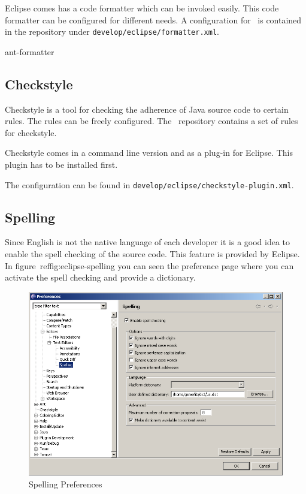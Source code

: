 \documentclass{extex-doc}
\begin{document}
Eclipse comes has a code formatter which can be invoked easily. This
code formatter can be configured for different needs. A configuration
for \ExTeX\ is contained in the repository under
\texttt{develop/eclipse/formatter.xml}.


ant-formatter


\subsection{Checkstyle}

Checkstyle is a tool for checking the adherence of Java source code to
certain rules. The rules can be freely configured. The \ExTeX\
repository contains a set of rules for checkstyle.

Checkstyle comes in a command line version and as a plug-in for
Eclipse. This plugin has to be installed first.

The configuration can be found in \texttt{develop/eclipse/checkstyle-plugin.xml}.


\subsection{Spelling}

Since English is not the native language of each developer it is a
good idea to enable the spell checking of the source code. This
feature is provided by Eclipse. In figure~ref{fig:eclipse-spelling}
you can seen the preference page where you can activate the spell
checking and provide a dictionary.
\begin{figure}[th]
  \centering
  \includegraphics[scale=.4]{image/spelling}
  \caption{Spelling Preferences}\label{fig:eclipse-spelling}
\end{figure}
\end{document}

